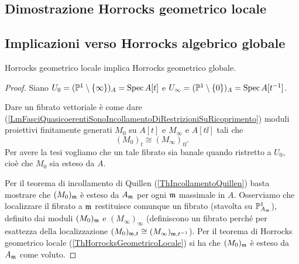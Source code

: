 \subsection{Dimostrazione Horrocks geometrico locale}


\subsection{Implicazioni verso Horrocks algebrico globale}

\begin{proposition}[]\label{PrHGLimplicaHGG}
Horrocks geometrico locale implica Horrocks geometrico globale.
\end{proposition}
\begin{proof}
Siano $U_0=(\mathbb{P}^1\setminus\left\{{\infty}\right\})_A=\operatorname{Spec} A[t]$ e $U_\infty=(\mathbb{P}^1\setminus\left\{{0}\right\})_A=\operatorname{Spec} A[t^{-1}]$.

Dare un fibrato vettoriale \`e come dare (\ref{LmFasciQuasicoerentiSonoIncollamentoDiRestrizioniSuRicoprimento}) moduli proiettivi finitamente generati $M_0$ su $A[t]$ e $M_\infty$ e $A[t\ii]$ tali che
\[(M_0)_t\cong (M_\infty)_{t\ii}.\]
Per avere la tesi vogliamo che un tale fibrato sia banale quando ristretto a $U_0$, cio\`e che $M_0$ sia esteso da $A$.

Per il teorema di incollamento di Quillen (\ref{ThIncollamentoQuillen}) basta mostrare che $(M_0)_{\mathfrak{m}}$ \`e esteso da $A_{\mathfrak{m}}$ per ogni $\mathfrak{m}$ massimale in $A$. Osserviamo che localizzare il fibrato a $\mathfrak{m}$ restituisce comunque un fibrato (stavolta su $\mathbb{P}^1_{A_{\mathfrak{m}}}$), definito dai moduli $(M_0)_{\mathfrak{m}}$ e $(M_\infty)_\infty$ (definiscono un fibrato perch\'e per esattezza della localizzazione $(M_0)_{\mathfrak{m},t}\cong (M_\infty)_{\mathfrak{m},t^{-1}}$). Per il teorema di Horrocks geometrico locale (\ref{ThHorrocksGeometricoLocale}) si ha che $(M_0)_{\mathfrak{m}}$ \`e esteso da $A_{\mathfrak{m}}$ come voluto.
\end{proof}


